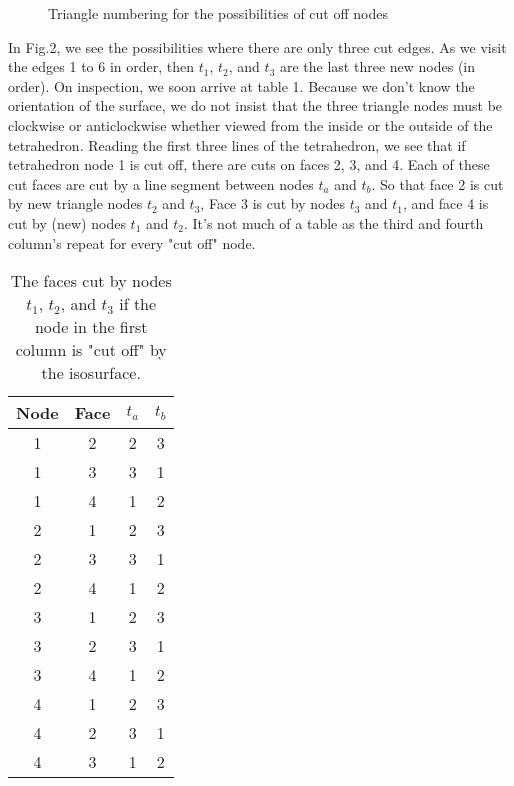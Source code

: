 \documentclass[12pt]{article}
\begin{document}
\begin{figure}
\vspace*{14cm}
\caption{Triangle numbering for the possibilities of cut off nodes}
\end{figure}

In Fig.2, we see the possibilities where there are only three
cut edges. As we visit the edges 1 to 6 in order, then $t_1$, $t_2$, and $t_3$
are the last three new nodes (in order). On inspection, we
soon  arrive at table 1. Because we don't know the orientation
of the surface, we do not insist that the three triangle nodes 
must be clockwise or anticlockwise whether viewed from the  inside or the outside
of the tetrahedron.  Reading the first three  lines of the tetrahedron,
we see that if tetrahedron node 1 is cut off, there are cuts 
on faces 2, 3, and 4. Each of these cut faces are cut by a line segment
between nodes $t_a$ and $t_b$.
So that face 2 is cut by new triangle nodes $t_2$ and $t_3$, Face
3 is cut by nodes  $t_3$ and $t_1$, and face 4 is cut by (new)  nodes $t_1$ and $t_2$.
It's not much of a table as the third and fourth column's
repeat for every "cut off" node.

\begin{table}
\begin{center}
\begin{tabular}{|c|c|c|c|}\hline
Node &    Face   &  $t_a$ &  $t_b$   \\ \hline
1 &        2  &   2   &  3    \\ \hline
1 &        3  &   3   &  1    \\ \hline
1 &        4  &   1   &  2    \\ \hline
2 &        1  &   2   &  3    \\ \hline
2 &        3  &   3   &  1    \\ \hline
2 &        4  &   1   &  2    \\ \hline
3 &        1  &   2   &  3    \\ \hline
3 &        2  &   3   &  1    \\ \hline
3 &        4  &   1   &  2    \\ \hline
4 &        1  &   2   &  3    \\ \hline
4 &        2  &   3   &  1    \\ \hline
4 &        3  &   1   &  2    \\ \hline
\end{tabular}
\end{center}
\caption{The faces cut by nodes $t_1$, $t_2$, and $t_3$ if the
node in the first column is "cut off" by the isosurface.}
\end{table}
\end{document}

